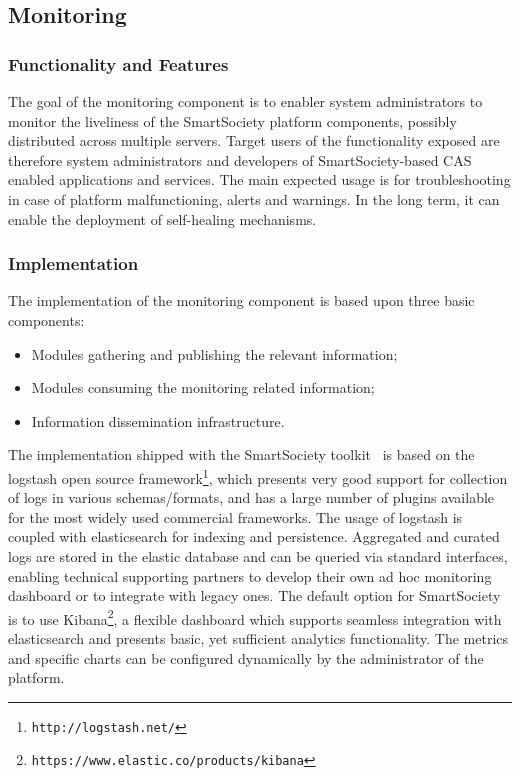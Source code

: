 \subsection{Monitoring}
\subsubsection{Functionality and Features}
The goal of the monitoring component is to enabler system administrators to monitor the liveliness of the SmartSociety platform components, possibly distributed across multiple servers. Target users of the functionality exposed are therefore system administrators and developers of SmartSociety-based CAS enabled applications and services. The main expected usage is for troubleshooting in case of platform malfunctioning, alerts and warnings. In the long term, it can enable the deployment of self-healing mechanisms.


\subsubsection{Implementation}
The implementation of the monitoring component is based upon three basic components:
\begin{itemize}
\item Modules gathering and publishing the relevant information;
\item Modules consuming the monitoring related information;
\item Information dissemination infrastructure.
\end{itemize}
The implementation shipped with the SmartSociety toolkit~\cite{D8.3} is based on the logstash open source framework\footnote{{\tt http://logstash.net/}}, which presents very good support for collection of logs in various schemas/formats, and has a large number of plugins available for the most widely used commercial frameworks. The usage of logstash is coupled with elasticsearch for indexing and persistence. Aggregated and curated logs are stored in the elastic database and can be queried via standard interfaces, enabling technical supporting partners to develop their own ad hoc monitoring dashboard or to integrate with legacy ones. The default option for SmartSociety is to use Kibana\footnote{{\tt https://www.elastic.co/products/kibana}}, a flexible dashboard which supports seamless integration with elasticsearch and presents basic, yet sufficient analytics functionality. The metrics and specific charts can be configured dynamically by the administrator of the platform.
